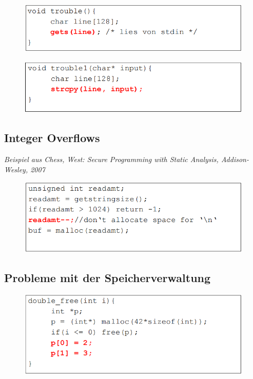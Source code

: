 \documentclass[openany]{book}
\begin{document}
\begin{figure}[h!]
    \centering
    \includegraphics[width=0.85\linewidth]{Pics/BufferOverflowRe1.PNG}
\end{figure}

\newpage

\begin{figure}[h!]
    \centering
    \includegraphics[width=0.85\linewidth]{Pics/BufferOverflowRe2.PNG}
\end{figure}

\subsection{Integer Overflows}

\textit{Beispiel aus Chess, West: Secure Programming with Static Analysis, Addison-Wesley, 2007}

\begin{figure}[h!]
    \centering
    \includegraphics[width=0.85\linewidth]{Pics/IntegerOverflowRe1.PNG}
\end{figure}

\subsection{Probleme mit der Speicherverwaltung}

\begin{figure}[h!]
    \centering
    \includegraphics[width=0.85\linewidth]{Pics/MemoryProblem.PNG}
\end{figure}
\end{document}

